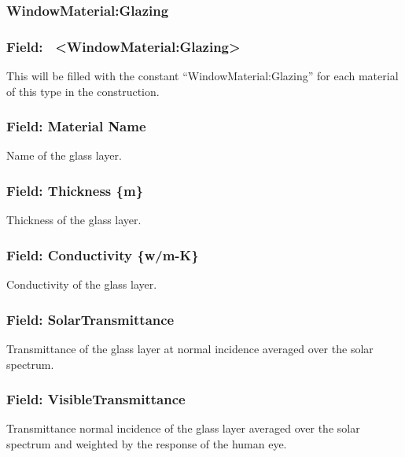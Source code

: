 \subsubsection{WindowMaterial:Glazing}\label{materialwindowglass}

\subsubsection{Field:~ \textless{}WindowMaterial:Glazing\textgreater{}}\label{field-materialwindowglass}

This will be filled with the constant ``WindowMaterial:Glazing'' for each material of this type in the construction.

\subsubsection{Field: Material Name}\label{field-material-name-2}

Name of the glass layer.

\subsubsection{Field: Thickness \{m\}}\label{field-thickness-m}

Thickness of the glass layer.

\subsubsection{Field: Conductivity \{w/m-K\}}\label{field-conductivity-wm-k}

Conductivity of the glass layer.

\subsubsection{Field: SolarTransmittance}\label{field-solartransmittance}

Transmittance of the glass layer at normal incidence averaged over the solar spectrum.

\subsubsection{Field: VisibleTransmittance}\label{field-visibletransmittance}

Transmittance normal incidence of the glass layer averaged over the solar spectrum and weighted by the response of the human eye.

